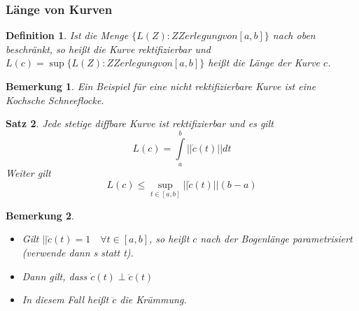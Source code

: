 \documentclass[12pt,a4paper]{article}%
\newtheorem{satz}{Satz}[section]
\newtheorem{definition}[satz]{Definition}
\newtheorem{bem}{Bemerkung}[section]
\numberwithin{equation}{section}
\numberwithin{equation}{subsection}
\begin{document}
	  \subsubsection{Länge von Kurven}
	  \begin{definition}
	    Ist die Menge $\lbrace L(Z): Z Zerlegung von [a,b] \rbrace$ nach oben beschränkt, so heißt die Kurve rektifizierbar und $L(c) = \sup \lbrace L(Z): Z Zerlegung von [a,b]\rbrace$ heißt die Länge der Kurve $c$.
	  \end{definition}
	  \begin{bem}
	    Ein Beispiel für eine nicht rektifizierbare Kurve ist eine Kochsche Schneeflocke.
	  \end{bem}
	  \begin{satz}
	    Jede stetige diffbare Kurve ist rektifizierbar und es gilt 
	    \begin{equation}
	      L(c) = \int\limits_a^b ||\dot{c}(t)|| dt
	    \end{equation}
	    Weiter gilt
	    \begin{equation}
	      L(c) \leq \sup\limits_{t \in [a,b]} || \dot{c}(t)|| (b-a)
	    \end{equation}
	  \end{satz}
	  \begin{bem}$\;$\newline
	    \begin{itemize}
	      \item[a) ] Gilt $||\dot{c}(t) = 1 \quad \forall  t \in [a,b]$, so heißt $c$ nach der Bogenlänge parametrisiert (verwende dann s statt t).
	      \item[b) ] Dann gilt, dass $\dot{c}(t) \perp \ddot{c}(t)$
	      \item[c) ] In diesem Fall heißt $\ddot{c}$ die Krümmung.
	    \end{itemize}
	  \end{bem}
\end{document}
